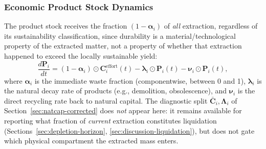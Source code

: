 \documentclass[twocolumn,10pt]{article}
\begin{document}
\subsubsection{Economic Product Stock Dynamics}
The product stock receives the fraction $(1-\boldsymbol\alpha_i)$ of \emph{all} extraction, regardless of its sustainability classification, since durability is a material/technological property of the extracted matter, not a property of whether that extraction happened to exceed the locally sustainable yield:
\begin{equation}
\frac{d\mathbf{P}_i}{dt} = (1 - \boldsymbol{\alpha}_i) \odot \mathbf{C}_i^{\text{effort}}(t) - \boldsymbol{\lambda}_i \odot \mathbf{P}_i(t) - \boldsymbol{\nu}_i \odot \mathbf{P}_i(t),
\label{eq:product}
\end{equation}
where \(\boldsymbol{\alpha}_i\) is the immediate waste fraction (componentwise, between 0 and 1), \(\boldsymbol{\lambda}_i\) is the natural decay rate of products (e.g., demolition, obsolescence), and \(\boldsymbol{\nu}_i\) is the direct recycling rate back to natural capital. The diagnostic split $\bar{\mathbf C}_i,\boldsymbol\Lambda_i$ of Section~\ref{sec:natcap-corrected} does \emph{not} appear here: it remains available for reporting what fraction of \emph{current} extraction constitutes liquidation (Sections~\ref{sec:depletion-horizon}, \ref{sec:discussion-liquidation}), but does not gate which physical compartment the extracted mass enters.
\end{document}
